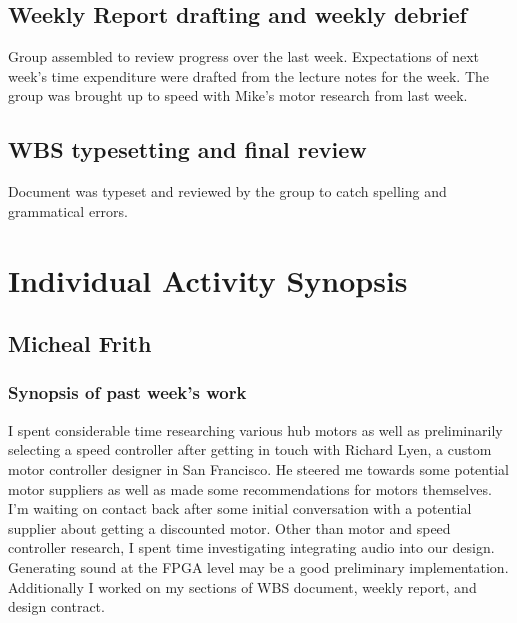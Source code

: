 \documentclass[12pt,compsoc]{IEEEtran}
\begin{document}
	\subsection{Weekly Report drafting and weekly debrief}
		Group assembled to review progress over the last week. Expectations of next week's time expenditure
		were drafted from the lecture notes for the week. The group was brought up to speed with Mike's
		motor research from last week.

	\subsection{WBS typesetting and final review}
		Document was typeset and reviewed by the group to catch spelling and grammatical errors.

\section{Individual Activity Synopsis}
	\subsection{Micheal Frith}

	\subsubsection*{Synopsis of past week's work}
        I spent considerable time researching various hub motors as well as preliminarily selecting a 
        speed controller after getting in touch with Richard Lyen, a custom motor controller designer 
        in San Francisco. He steered me towards some potential motor suppliers as well as made some 
        recommendations for motors themselves. I'm waiting on contact back after some initial 
        conversation with a potential supplier about getting a discounted motor. Other than motor and 
        speed controller research, I spent time investigating integrating audio into our design. 
        Generating sound at the FPGA level may be a good preliminary implementation. Additionally 
        I worked on my sections of WBS document, weekly report, and design contract.
\end{document}
